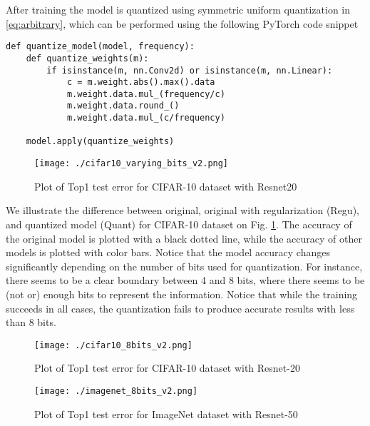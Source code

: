 \documentclass{article}
\newcommand{\squeeze}{\vspace{-2.5mm}}
\begin{document}
After training the model is quantized using symmetric uniform quantization in \eqref{eq:arbitrary}, which can be performed using the following PyTorch \cite{PyTorch} code snippet

\begin{verbatim}
def quantize_model(model, frequency):
    def quantize_weights(m):
        if isinstance(m, nn.Conv2d) or isinstance(m, nn.Linear):
            c = m.weight.abs().max().data
            m.weight.data.mul_(frequency/c)
            m.weight.data.round_()
            m.weight.data.mul_(c/frequency)

    model.apply(quantize_weights)
\end{verbatim}

\begin{figure}[h]
 \begin{center}
  \texttt{[image: ./cifar10\_varying\_bits\_v2.png]}
  \caption{Plot of Top1 test error for CIFAR-10 dataset with Resnet20}
  \label{fig:cifar10_resnet20_variable_amp}
  \squeeze
 \end{center}
\end{figure}


We illustrate the difference between original, original with regularization (Regu), and quantized model (Quant) for CIFAR-10 dataset on Fig. \ref{fig:cifar10_resnet20_variable_amp}. The accuracy of the original model is plotted with a black dotted line, while the accuracy of other models is plotted with color bars. Notice that the model accuracy changes significantly depending on the number of bits used for quantization. For instance, there seems to be a clear boundary between 4 and 8 bits, where there seems to be (not or) enough bits to represent the information. Notice that while the training succeeds in all cases, the quantization fails to produce accurate results with less than 8 bits.

\begin{figure}[h]
 \begin{center}
  \texttt{[image: ./cifar10\_8bits\_v2.png]}
  \caption{Plot of Top1 test error for CIFAR-10 dataset with Resnet-20}
  \label{fig:cifar10_resnet20_fixed_amp}
  \squeeze
 \end{center}
\end{figure}

\begin{figure}[h]
 \begin{center}
  \texttt{[image: ./imagenet\_8bits\_v2.png]}
  \caption{Plot of Top1 test error for ImageNet dataset with Resnet-50}
  \label{fig:imagenet_resnet50}
  \squeeze
 \end{center}
\end{figure}
\end{document}
